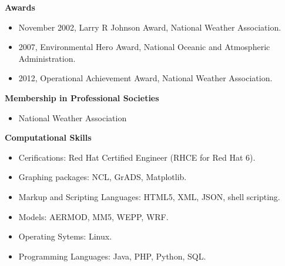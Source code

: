 \normalsize \sf
\Large \bf Awards\\
\normalsize \sf
\begin{itemize}
\item November 2002, Larry R Johnson Award, National Weather Association.
\item 2007, Environmental Hero Award, National Oceanic and Atmospheric Administration.
\item 2012, Operational Achievement Award, National Weather Association.
\end{itemize}
\Large \bf Membership in Professional Societies\\
\normalsize \sf	
\begin{itemize}
\item National Weather Association
\end{itemize}
\Large \bf Computational Skills\\
\normalsize \sf
\begin{itemize}
\item Cerifications: Red Hat Certified Engineer (RHCE for Red Hat 6).
\item Graphing packages: NCL, GrADS, Matplotlib.
\item Markup and Scripting Languages: HTML5, XML, JSON, shell scripting.
\item Models: AERMOD, MM5, WEPP, WRF.
\item Operating Sytems: Linux.
\item Programming Languages: Java, PHP, Python, SQL.
\end{itemize} 
\pagebreak

